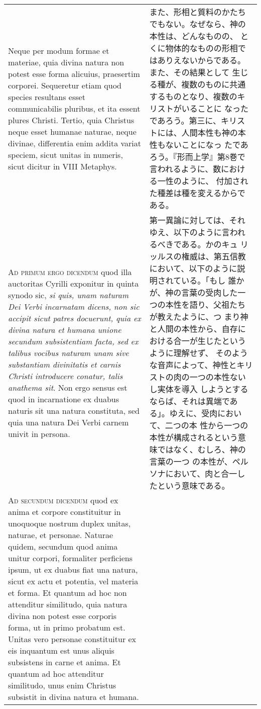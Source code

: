 \documentclass[10pt]{jsarticle} %
\begin{document}
\begin{longtable}{p{21em}p{21em}}
\\


Neque per modum formae et materiae, quia divina natura non potest esse
forma alicuius, praesertim corporei. Sequeretur etiam quod species
resultans esset communicabilis pluribus, et ita essent plures
Christi. Tertio, quia Christus neque esset humanae naturae, neque
divinae, differentia enim addita variat speciem, sicut unitas in
numeris, sicut dicitur in VIII Metaphys.


&

また、形相と質料のかたちでもない。なぜなら、神の本性は、どんなものの、
とくに物体的なものの形相ではありえないからである。また、その結果として
生じる種が、複数のものに共通するものとなり、複数のキリストがいることに
なったであろう。第三に、キリストには、人間本性も神の本性もないことになっ
たであろう。『形而上学』第8巻で言われるように、数における一性のように、
付加された種差は種を変えるからである。


\\



{\scshape Ad primum ergo dicendum} quod illa auctoritas Cyrilli
exponitur in quinta synodo sic, {\itshape si quis, unam naturam Dei
Verbi incarnatam dicens, non sic accipit sicut patres docuerunt, quia
ex divina natura et humana unione secundum subsistentiam facta, sed ex
talibus vocibus naturam unam sive substantiam divinitatis et carnis
Christi introducere conatur, talis anathema sit}. Non ergo sensus est
quod in incarnatione ex duabus naturis sit una natura constituta, sed
quia una natura Dei Verbi carnem univit in persona.


&

第一異論に対しては、それゆえ、以下のように言われるべきである。かのキュ
リッルスの権威は、第五信教において、以下のように説明されている。「もし
誰かが、神の言葉の受肉した一つの本性を語り、父祖たちが教えたように、つ
まり神と人間の本性から、自存における合一が生じたというように理解せず、
そのような音声によって、神性とキリストの肉の一つの本性ないし実体を導入
しようとするならば、それは異端である」。ゆえに、受肉において、二つの本
性から一つの本性が構成されるという意味ではなく、むしろ、神の言葉の一つ
の本性が、ペルソナにおいて、肉と合一したという意味である。

\\



{\scshape Ad secundum dicendum} quod ex anima et corpore constituitur
in unoquoque nostrum duplex unitas, naturae, et personae. Naturae
quidem, secundum quod anima unitur corpori, formaliter perficiens
ipsum, ut ex duabus fiat una natura, sicut ex actu et potentia, vel
materia et forma. Et quantum ad hoc non attenditur similitudo, quia
natura divina non potest esse corporis forma, ut in primo probatum
est. Unitas vero personae constituitur ex eis inquantum est unus
aliquis subsistens in carne et anima. Et quantum ad hoc attenditur
similitudo, unus enim Christus subsistit in divina natura et humana.



\end{longtable}
\end{document}
